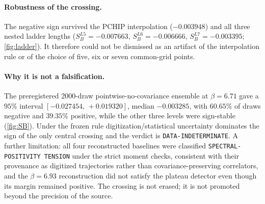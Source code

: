 \documentclass[11pt,a4paper]{article}
\theoremstyle{definition}
\theoremstyle{remark}
\begin{document}
\paragraph{Robustness of the crossing.} The negative sign survived the PCHIP interpolation ($-0.003948$) and all three nested ladder lengths ($S_B^{L5}=-0.007663$, $S_B^{L6}=-0.006666$, $S_B^{L7}=-0.003395$; \cref{fig:ladder}). It therefore could not be dismissed as an artifact of the interpolation rule or of the choice of five, six or seven common-grid points.

\paragraph{Why it is not a falsification.} The preregistered 2000-draw pointwise-no-covariance ensemble at $\beta=6.71$ gave a $95\%$ interval $[-0.027454,\,+0.019320]$, median $-0.003285$, with $60.65\%$ of draws negative and $39.35\%$ positive, while the other three levels were sign-stable (\cref{fig:SB}). Under the frozen rule digitization/statistical uncertainty dominates the sign of the only central crossing and the verdict is \texttt{DATA-\allowbreak{}INDETERMINATE}. A further limitation: all four reconstructed baselines were classified \texttt{SPECTRAL-\allowbreak{}POSITIVITY TENSION} under the strict moment checks, consistent with their provenance as digitized trajectories rather than covariance-preserving correlators, and the $\beta=6.93$ reconstruction did not satisfy the plateau detector even though its margin remained positive. The crossing is not erased; it is not promoted beyond the precision of the source.
\end{document}
